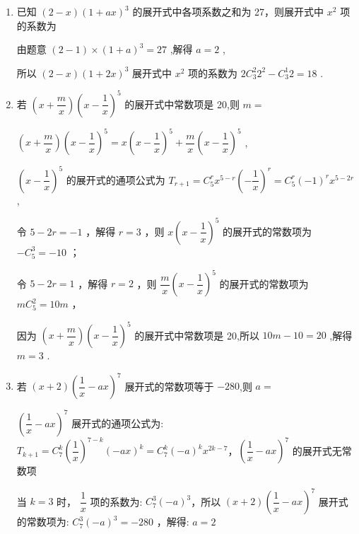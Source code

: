 \begin{enumerate}
\begin{enumerate}
        \item 已知 $(2-x)(1+ax)^{3}$ 的展开式中各项系数之和为 27，则展开式中 $x^{2}$ 项的系数为
        \begin{jieda}
            由题意 $\left( {2 - 1}\right)  \times  {\left( 1 + a\right) }^{3} = {27}$ ,解得 $a = 2$ ,
            
            所以 $\left( {2 - x}\right) {\left( 1 + 2x\right) }^{3}$ 展开式中 ${x}^{2}$ 项的系数为 $2{{C}}_{3}^{2}{2}^{2} - {{C}}_{3}^{1}2 = {18}$ .
        \end{jieda}
        
        \item 若 $\left( {x + \dfrac{m}{x}}\right) {\left( x - \dfrac{1}{x}\right) }^{5}$ 的展开式中常数项是 20,则 $m =$
        \begin{jieda}
            $\left( {x + \dfrac{m}{x}}\right) {\left( x - \dfrac{1}{x}\right) }^{5} = x{\left( x - \dfrac{1}{x}\right) }^{5} + \dfrac{m}{x}{\left( x - \dfrac{1}{x}\right) }^{5}$ ,
            
            ${\left( x - \dfrac{1}{x}\right) }^{5}$ 的展开式的通项公式为 ${T}_{r + 1} = {{C}}_{5}^{r}{x}^{5 - r}{\left( -\dfrac{1}{x}\right) }^{r} = {{C}}_{5}^{r}{\left( -1\right) }^{r}{x}^{5 - {2r}}$ ,
            
            令 $5 - {2r} =  - 1$ ，解得 $r = 3$ ，则 $x{\left( x - \dfrac{1}{x}\right) }^{5}$ 的展开式的常数项为 $- {{C}}_{5}^{3} =  - {10}$ ；
            
            令 $5 - {2r} = 1$ ，解得 $r = 2$ ，则 $\dfrac{m}{x}{\left( x - \dfrac{1}{x}\right) }^{5}$ 的展开式的常数项为 $m{{C}}_{5}^{2} = {10m}$ ，
            
            因为 $\left( {x + \dfrac{m}{x}}\right) {\left( x - \dfrac{1}{x}\right) }^{5}$ 的展开式中常数项是 20,所以 ${10m} - {10} = {20}$ ,解得 $m = 3$ .
        \end{jieda}

        
        \item 若 $\left( {x + 2}\right) {\left( \dfrac{1}{x} - ax\right) }^{7}$ 展开式的常数项等于 $-280$,则 $a =$ 
        \begin{jieda}
            ${\left( \dfrac{1}{x} - ax\right) }^{7}$ 展开式的通项公式为: ${T}_{k + 1} = {C}_{7}^{k}{\left( \dfrac{1}{x}\right) }^{7 - k}{\left( -ax\right) }^{k} = {C}_{7}^{k}{\left( -a\right) }^{k}{x}^{{2k} - 7}$，${\left( \dfrac{1}{x} - ax\right) }^{7}$ 的展开式无常数项
            
            当 $k = 3$ 时， $\dfrac{1}{x}$ 项的系数为: ${C}_{7}^{3}{\left( -a\right) }^{3}$，所以 $\left( {x + 2}\right) {\left( \dfrac{1}{x} - ax\right) }^{7}$ 展开式的常数项为: ${C}_{7}^{3}{\left( -a\right) }^{3} =  - {280}$ ，解得: $a = 2$
        \end{jieda}
        

\end{enumerate}
\end{enumerate}
